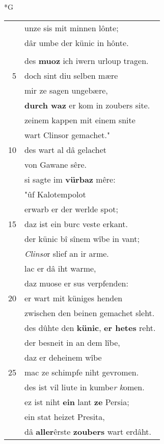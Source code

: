 \documentclass[8pt,a4paper,notitlepage]{article}
\begin{document}
\begin{table}[ht]
\begin{minipage}[t]{0.5\linewidth}
\small
\begin{center}*G
\end{center}
\begin{tabular}{rl}
 & unze sis mit minnen lônte;\\ 
 & dâr umbe der künic in hônte.\\ 
 & \textbf{\begin{large}S\end{large}ol} ich iu \textbf{sîniu tougen} sagen,\\ 
 & des \textbf{muoz} ich iwern urloup tragen.\\ 
5 & doch sint diu selben mære\\ 
 & mir ze sagen ungebære,\\ 
 & \textbf{durch waz} er kom in zoubers site.\\ 
 & zeinem kappen mit einem snite\\ 
 & wart Clinsor gemachet."\\ 
10 & des wart al dâ gelachet\\ 
 & von Gawane sêre.\\ 
 & si sagte im \textbf{vürbaz} mêre:\\ 
 & "ûf Kalotempolot\\ 
 & erwarb er der werlde spot;\\ 
15 & daz ist ein burc veste erkant.\\ 
 & der künic bî sînem wîbe in vant;\\ 
 & \textit{Clinso}r slief an ir arme.\\ 
 & lac er dâ iht warme,\\ 
 & daz muose er sus verpfenden:\\ 
20 & er wart mit küniges henden\\ 
 & zwischen den beinen gemachet sleht.\\ 
 & des dûhte den \textbf{künic}, \textbf{er hetes} reht.\\ 
 & der besneit in an dem lîbe,\\ 
 & daz er deheinem wîbe\\ 
25 & mac ze schimpfe niht gevromen.\\ 
 & des ist vil liute in kumbe\textit{r} \textit{k}omen.\\ 
 & ez ist niht \textbf{ein} lant \textbf{ze} Persia;\\ 
 & ein stat heizet Presita,\\ 
 & dâ \textbf{aller}êrste \textbf{zoubers} wart erdâht.\\ 

\end{tabular}
\end{minipage}
\end{table}
\end{document}
